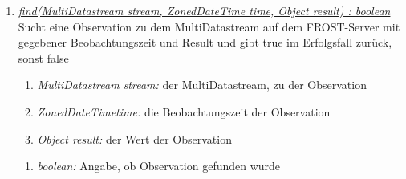 \begin{enumerate}[+]
\item \underline{\textit{find(MultiDatastream stream, ZonedDateTime time, Object result) : boolean}}\\
Sucht eine Observation zu dem MultiDatastream auf dem FROST-Server mit gegebener Beobachtungszeit und Result und gibt true im Erfolgsfall zurück, sonst false

\begin{enumerate}[$\bullet$]
\item \textit{MultiDatastream stream:} der MultiDatastream, zu der Observation
\item \textit{ZonedDateTimetime:} die Beobachtungszeit der Observation
\item \textit{Object result:} der Wert der Observation
\end{enumerate}
\vspace{-0.2cm}
\begin{enumerate}[$\circ$]
\item \textit{boolean:} Angabe, ob Observation gefunden wurde
\end{enumerate}

\end{enumerate}